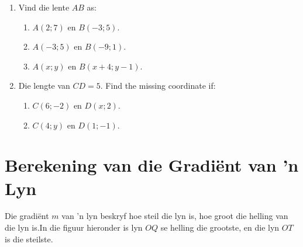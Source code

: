 \begin{exercises}{}
{
\begin{enumerate}[noitemsep, label=\textbf{\arabic*}. ]
\item Vind die lente $AB$ as:
    \begin{enumerate}[noitemsep, label=\textbf{(\alph*)} ] 
    \item $A(2;7)$ en $B(-3;5)$.
    \item $A(-3;5)$ en $B(-9;1)$.
    \item $A(x;y)$ en $B(x+4;y-1)$.
    \end{enumerate}

\item Die lengte van $CD=5$. Find the missing coordinate if:
    \begin{enumerate}[noitemsep, label=\textbf{(\alph*)} ] 
    \item $C(6;-2)$ en $D(x;2)$.
    \item $C(4;y)$ en $D(1;-1)$.
    \end{enumerate}
\end{enumerate}

}
\end{exercises}

%     
%     
%     

\section{Berekening van die Gradiënt van ’n Lyn}
Die gradiënt $m$  van ’n lyn beskryf hoe steil die lyn is, hoe groot die helling van die lyn is.In die figuur hieronder is lyn $OQ$ se helling die grootste, en die lyn $OT$ is die steilste.


